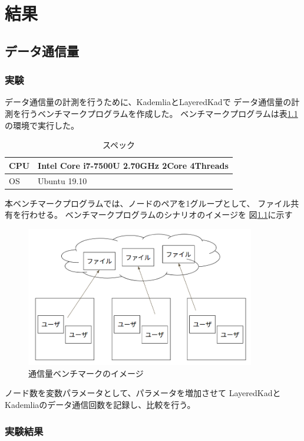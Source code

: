 \documentclass[sotsuron]{jcsie}
\begin{document}
\chapter{結果}
\section{データ通信量}
\subsection{実験}

データ通信量の計測を行うために、KademliaとLayeredKadで
データ通信量の計測を行うベンチマークプログラムを作成した。
ベンチマークプログラムは表\ref{table:spec-note}の環境で実行した。

\begin{table}[H]
	\caption{スペック}	
	\centering
	\label{table:spec-note}
	\begin{tabular}{|l|l|}
		\hline
		CPU &   
		Intel Core i7-7500U 2.70GHz 2Core 4Threads\\ 
		\hline	
		OS  &   
		Ubuntu 19.10 \\ 
		\hline
	\end{tabular}	
\end{table}

本ベンチマークプログラムでは、ノードのペアを1グループとして、
ファイル共有を行わせる。
ベンチマークプログラムのシナリオのイメージを
図\ref{fig:trafficBenchmark}に示す

\begin{figure}[H]
	\centering
	\includegraphics[width=10cm]{./assets/image/traffic_benchmark.png}
	\caption{通信量ベンチマークのイメージ}
	\label{fig:trafficBenchmark}
\end{figure}

ノード数を変数パラメータとして、パラメータを増加させて
LayeredKadとKademliaのデータ通信回数を記録し、比較を行う。

\subsection{実験結果}
\end{document}
